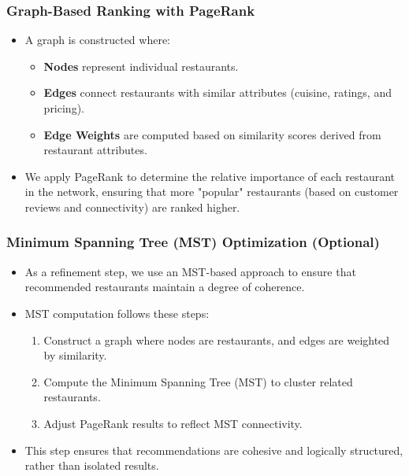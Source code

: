 \documentclass[fontsize=11pt]{article}
\begin{document}
\subsubsection*{Graph-Based Ranking with PageRank}
\begin{itemize}
    \item A graph is constructed where: 
    \begin{itemize}
        \item \textbf{Nodes} represent individual restaurants.
        \item \textbf{Edges} connect restaurants with similar attributes (cuisine, ratings, and pricing).
        \item \textbf{Edge Weights} are computed based on similarity scores derived from restaurant attributes.
    \end{itemize}
    \item We apply PageRank to determine the relative importance of each restaurant in the network, ensuring that more "popular" restaurants (based on customer reviews and connectivity) are ranked higher.
\end{itemize}

\subsubsection*{Minimum Spanning Tree (MST) Optimization (Optional)}
\begin{itemize}
    \item As a refinement step, we use an MST-based approach to ensure that recommended restaurants maintain a degree of coherence.
    \item MST computation follows these steps: 
    \begin{enumerate}
        \item Construct a graph where nodes are restaurants, and edges are weighted by similarity.
        \item Compute the Minimum Spanning Tree (MST) to cluster related restaurants.
        \item Adjust PageRank results to reflect MST connectivity.
    \end{enumerate}
    \item This step ensures that recommendations are cohesive and logically structured, rather than isolated results.
\end{itemize}
\end{document}
